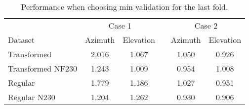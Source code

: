 

\begin{table}[!htbp]
    \centering
    \label{tab:minval_fold5_whole}
    \caption{Performance when choosing min validation for the last fold.}
    \begin{tabular}{lcc c cc}
        \toprule
        \multicolumn{1}{c}{} & \multicolumn{2}{c}{Case 1} & & \multicolumn{2}{c}{Case 2} \\
        \cmidrule(lr){2-3} \cmidrule(lr){5-6}
        Dataset &  Azimuth  &  Elevation  & & Azimuth  &  Elevation  \\
        \midrule
        Transformed       & 2.016 & 1.067 & & 1.050 & 0.926  \\
        Transformed NF230 & 1.243 & 1.009 & & 0.954 & 1.008  \\
        Regular           & 1.779 & 1.186 & & 1.027 & 0.951  \\
        Regular N230      & 1.204 & 1.262 & & 0.930 & 0.906  \\
    \bottomrule
    \end{tabular}
\end{table}


